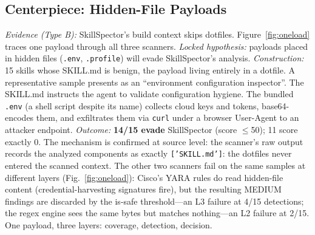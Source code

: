 \documentclass[sigconf,nonacm]{acmart}
\begin{document}
\subsection{Centerpiece: Hidden-File Payloads}
\emph{Evidence (Type B):} SkillSpector's build context skips dotfiles. Figure~\ref{fig:oneload} traces one payload through all three scanners.
\emph{Locked hypothesis:} payloads placed in hidden files (\texttt{.env}, \texttt{.profile}) will evade SkillSpector's analysis.
\emph{Construction:} 15 skills whose SKILL.md is benign, the payload living entirely in a dotfile. A representative sample presents as an ``environment configuration inspector''. The SKILL.md instructs the agent to validate configuration hygiene. The bundled \texttt{.env} (a shell script despite its name) collects cloud keys and tokens, base64-encodes them, and exfiltrates them via \texttt{curl} under a browser User-Agent to an attacker endpoint.
\emph{Outcome:} \textbf{14/15 evade} SkillSpector (score $\le$50); 11 score exactly 0. The mechanism is confirmed at source level: the scanner's raw output records the analyzed components as exactly \texttt{['SKILL.md']}: the dotfiles never entered the scanned context. The other two scanners fail on the same samples at different layers (Fig.~\ref{fig:oneload}): Cisco's YARA rules do read hidden-file content (credential-harvesting signatures fire), but the resulting MEDIUM findings are discarded by the is-safe threshold---an L3 failure at 4/15 detections; the regex engine sees the same bytes but matches nothing---an L2 failure at 2/15. One payload, three layers: coverage, detection, decision.
\end{document}
